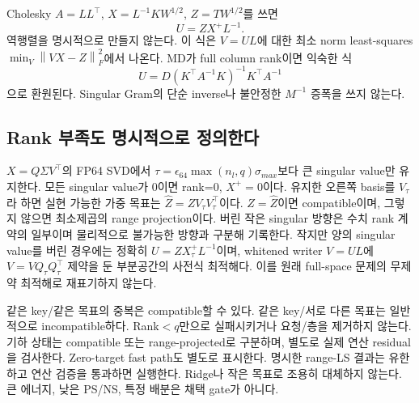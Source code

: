 \documentclass[11pt]{article}
\newcommand{\norm}[1]{\left\lVert #1\right\rVert}
\begin{document}
Cholesky $A=LL^\top$, $X=L^{-1}KW^{1/2}$, $Z=TW^{1/2}$를 쓰면
\[
 \boxed{U=ZX^+L^{-1}}.
\]
역행렬을 명시적으로 만들지 않는다. 이 식은 $V=UL$에 대한 최소 norm
least-squares $\min_V\norm{VX-Z}_F^2$에서 나온다.
MD가 full column rank이면 익숙한 식
\[
 U=D(K^\top A^{-1}K)^{-1}K^\top A^{-1}
\]
으로 환원된다. Singular Gram의 단순 inverse나 불안정한 $M^{-1}$ 증폭을 쓰지 않는다.

\subsection{Rank 부족도 명시적으로 정의한다}
$X=Q\Sigma V^\top$의 FP64 SVD에서
$\tau=\epsilon_{64}\max(n_l,q)\sigma_{max}$보다 큰 singular value만 유지한다.
모든 singular value가 0이면 rank=0, $X^+=0$이다.
유지한 오른쪽 basis를 $V_\tau$라 하면 실현 가능한 가중 목표는
$\widehat Z=ZV_\tau V_\tau^\top$이다. $Z=\widehat Z$이면 compatible이며,
그렇지 않으면 최소제곱의 range projection이다. 버린 작은 singular 방향은
수치 rank 계약의 일부이며 물리적으로 불가능한 방향과 구분해 기록한다.
작지만 양의 singular value를 버린 경우에는 정확히
$U=ZX_\tau^+L^{-1}$이며, whitened writer $V=UL$에
$V=VQ_\tau Q_\tau^\top$ 제약을 둔 부분공간의 사전식 최적해다.
이를 원래 full-space 문제의 무제약 최적해로 재표기하지 않는다.

같은 key/같은 목표의 중복은 compatible할 수 있다. 같은 key/서로 다른 목표는
일반적으로 incompatible하다. Rank$<q$만으로 실패시키거나 요청/층을 제거하지 않는다.
기하 상태는 compatible 또는 range-projected로 구분하며, 별도로 실제 연산
residual을 검사한다. Zero-target fast path도 별도로 표시한다.
명시한 range-LS 결과는 유한하고 연산 검증을 통과하면 실행한다. Ridge나 작은
목표로 조용히 대체하지 않는다. 큰 에너지, 낮은 PS/NS, 특정 배분은 채택 gate가 아니다.
\end{document}
